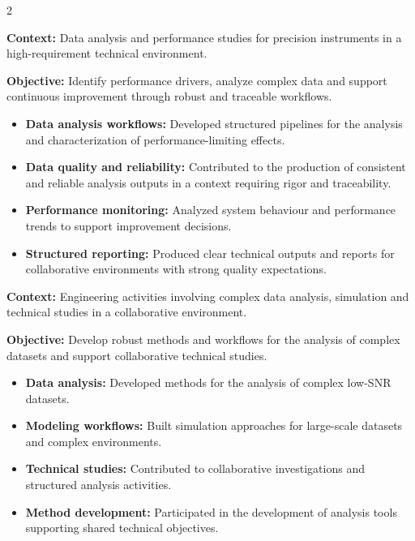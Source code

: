\documentclass[8pt,a4paper,ragged2e,withhyper]{altacv}
\begin{document}
\begin{paracol}{2}
\divider


\textbf{Context:} Data analysis and performance studies for precision instruments in a high-requirement technical environment.

\textbf{Objective:} Identify performance drivers, analyze complex data and support continuous improvement through robust and traceable workflows.

\begin{itemize}
\item \textbf{Data analysis workflows:} Developed structured pipelines for the analysis and characterization of performance-limiting effects.
\item \textbf{Data quality and reliability:} Contributed to the production of consistent and reliable analysis outputs in a context requiring rigor and traceability.
\item \textbf{Performance monitoring:} Analyzed system behaviour and performance trends to support improvement decisions.
\item \textbf{Structured reporting:} Produced clear technical outputs and reports for collaborative environments with strong quality expectations.
\end{itemize}

\vspace{2cm}

\textbf{Context:} Engineering activities involving complex data analysis, simulation and technical studies in a collaborative environment.

\textbf{Objective:} Develop robust methods and workflows for the analysis of complex datasets and support collaborative technical studies.

\begin{itemize}
\item \textbf{Data analysis:} Developed methods for the analysis of complex low-SNR datasets.
\item \textbf{Modeling workflows:} Built simulation approaches for large-scale datasets and complex environments.
\item \textbf{Technical studies:} Contributed to collaborative investigations and structured analysis activities.
\item \textbf{Method development:} Participated in the development of analysis tools supporting shared technical objectives.
\end{itemize}


\end{paracol}
\end{document}
